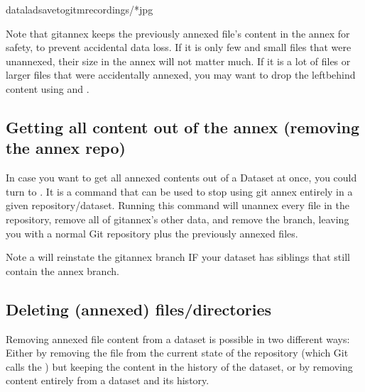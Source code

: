 \begin{sphinxVerbatim}[commandchars=\\\{\}]
dataladsave\PYGZhy{}\PYGZhy{}to\PYGZhy{}git\PYGZhy{}mrecordings/*jpg
\end{sphinxVerbatim}

\sphinxAtStartPar
Note that git\sphinxhyphen{}annex keeps the previously annexed file’s content in the annex for safety, to prevent accidental data loss.
If it is only few and small files that were unannexed, their size in the annex will not matter much.
If it is a lot of files or larger files that were accidentally annexed, you may want to drop the left\sphinxhyphen{}behind content using  and .


\subsection{Getting all content out of the annex (removing the annex repo)}
\label{\detokenize{basics/101-136-filesystem:getting-all-content-out-of-the-annex-removing-the-annex-repo}}\label{\detokenize{basics/101-136-filesystem:uninit}}
\sphinxAtStartPar
In case you want to get all annexed contents out of a Dataset at once, you could turn to .
It is a command that can be used to stop using git annex entirely in a given repository/dataset.
Running this command will unannex every file in the repository, remove all of git\sphinxhyphen{}annex’s other data, and remove the {\hyperref[\detokenize{glossary:term-git-annex}]{}} branch, leaving you with a normal Git repository plus the previously annexed files.

\sphinxAtStartPar
Note a  will reinstate the git\sphinxhyphen{}annex branch IF your dataset has siblings that still contain the annex branch.


\subsection{Deleting (annexed) files/directories}
\label{\detokenize{basics/101-136-filesystem:deleting-annexed-files-directories}}
\sphinxAtStartPar
Removing annexed file content from a dataset is possible in two different ways:
Either by removing the file from the current state of the repository
(which Git calls the ) but keeping the content in the history
of the dataset, or by removing content entirely from a dataset and its
history.


